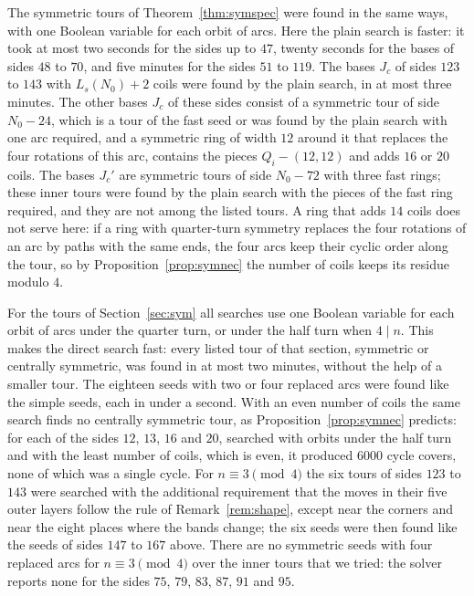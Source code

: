 \documentclass[11pt]{amsart}
\theoremstyle{remark}
\begin{document}
The symmetric tours of Theorem~\ref{thm:symspec} were found in the same ways, with one Boolean variable for each
orbit of arcs. Here the plain search is faster: it took at most two seconds for the sides up to $47$, twenty seconds
for the bases of sides $48$ to $70$, and five minutes for the sides $51$ to $119$. The bases $J_c$ of sides $123$ to
$143$ with $L_s(N_0)+2$ coils were found by the plain search, in at most three minutes. The other bases $J_c$ of
these sides consist of a symmetric tour of side $N_0-24$, which is a tour of the fast seed or was found by the plain
search with one arc required, and a
symmetric ring of width $12$ around it that replaces the four rotations of this arc, contains the pieces
$Q_i-(12,12)$ and adds $16$ or $20$ coils. The bases $J_c'$ are symmetric tours of side $N_0-72$ with three fast
rings; these inner tours were found by the plain search with the pieces of the fast ring required, and they are
not among the listed tours. A ring that adds $14$ coils does not serve here: if a ring with quarter-turn symmetry replaces the four
rotations of an arc by paths with the same ends, the four arcs keep their cyclic order along the tour, so by
Proposition~\ref{prop:symnec} the number of coils keeps its residue modulo $4$.

For the tours of Section~\ref{sec:sym} all searches use one Boolean variable for each orbit of arcs under the
quarter turn, or under the half turn when $4\mid n$. This makes the direct search fast: every listed tour of that
section, symmetric or centrally symmetric, was found in at most two minutes, without the help of a smaller tour. The eighteen seeds with two or four replaced arcs were found like the
simple seeds, each in under a second. With an even number of coils the same search finds no centrally symmetric
tour, as Proposition~\ref{prop:symnec} predicts: for each of the sides $12$, $13$, $16$ and $20$, searched with
orbits under the half turn and with the least number of coils, which is even, it produced $6000$ cycle covers, none
of which was a single cycle. For $n\equiv3\pmod 4$ the six tours of sides $123$ to $143$ were searched with the
additional requirement that the moves in their five outer layers follow the rule of Remark~\ref{rem:shape}, except
near the corners and near the eight places where the bands change; the six seeds were then found like the seeds of
sides $147$ to $167$ above. There are no symmetric seeds with four replaced arcs for $n\equiv3\pmod 4$ over the
inner tours that we tried: the solver reports none for the sides $75$, $79$, $83$, $87$, $91$ and $95$.
\end{document}
